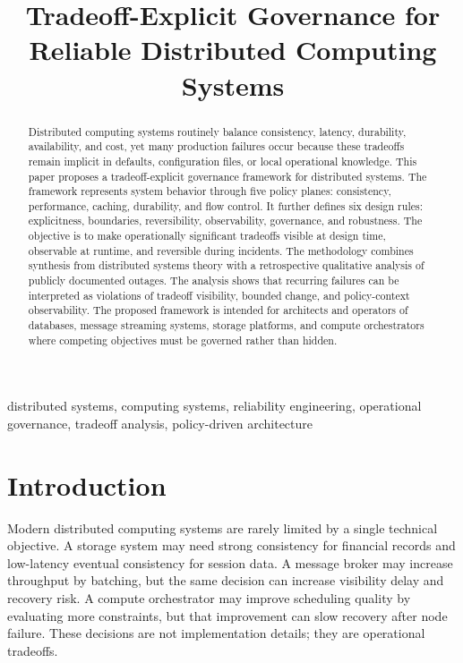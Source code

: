 \documentclass[conference]{IEEEtran}
\title{Tradeoff-Explicit Governance for Reliable Distributed Computing Systems}
\author{\IEEEauthorblockN{Anonymous Submission}}
\begin{document}
\maketitle

\begin{abstract}
Distributed computing systems routinely balance consistency, latency, durability, availability, and cost, yet many production failures occur because these tradeoffs remain implicit in defaults, configuration files, or local operational knowledge. This paper proposes a tradeoff-explicit governance framework for distributed systems. The framework represents system behavior through five policy planes: consistency, performance, caching, durability, and flow control. It further defines six design rules: explicitness, boundaries, reversibility, observability, governance, and robustness. The objective is to make operationally significant tradeoffs visible at design time, observable at runtime, and reversible during incidents. The methodology combines synthesis from distributed systems theory with a retrospective qualitative analysis of publicly documented outages. The analysis shows that recurring failures can be interpreted as violations of tradeoff visibility, bounded change, and policy-context observability. The proposed framework is intended for architects and operators of databases, message streaming systems, storage platforms, and compute orchestrators where competing objectives must be governed rather than hidden.
\end{abstract}

\begin{IEEEkeywords}
distributed systems, computing systems, reliability engineering, operational governance, tradeoff analysis, policy-driven architecture
\end{IEEEkeywords}

\section{Introduction}

Modern distributed computing systems are rarely limited by a single technical objective. A storage system may need strong consistency for financial records and low-latency eventual consistency for session data. A message broker may increase throughput by batching, but the same decision can increase visibility delay and recovery risk. A compute orchestrator may improve scheduling quality by evaluating more constraints, but that improvement can slow recovery after node failure. These decisions are not implementation details; they are operational tradeoffs.
\end{document}
